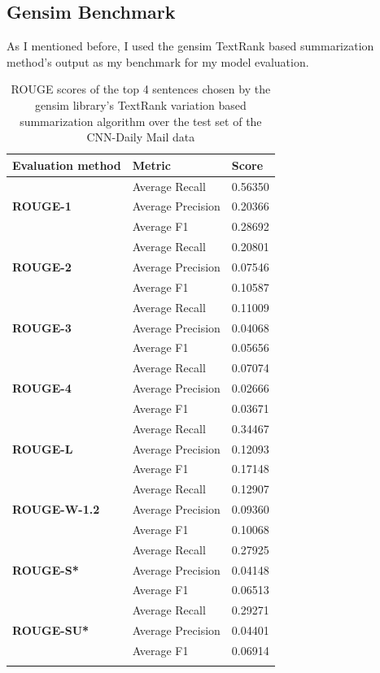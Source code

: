 \subsection{Gensim Benchmark}
As I mentioned before, I used the gensim TextRank based summarization method's output as my benchmark for my model evaluation.
\begin{longtable}{| l | l | l |}
	\hline
	\textbf{Evaluation method}&\textbf{Metric}&\textbf{Score}\\ \hline \hline
	\multirow{3}{*}{\textbf{ROUGE-1}}
	&Average Recall&0.56350 \\
	&Average Precision&0.20366  \\
	&Average F1&0.28692  \\ \hline \hline
	\multirow{3}{*}{\textbf{ROUGE-2}}
	&Average Recall&0.20801 \\
	&Average Precision&0.07546 \\
	&Average F1&0.10587 \\ \hline \hline
	\multirow{3}{*}{\textbf{ROUGE-3}}
	&Average Recall&0.11009 \\
	&Average Precision&0.04068 \\
	&Average F1&0.05656 \\ \hline \hline
	\multirow{3}{*}{\textbf{ROUGE-4}}
	&Average Recall&0.07074 \\
	&Average Precision&0.02666 \\
	&Average F1&0.03671 \\ \hline \hline
	\multirow{3}{*}{\textbf{ROUGE-L}}
	&Average Recall&0.34467 \\
	&Average Precision&0.12093 \\
	&Average F1&0.17148 \\ \hline \hline
	\multirow{3}{*}{\textbf{ROUGE-W-1.2}}
	&Average Recall&0.12907 \\
	&Average Precision&0.09360 \\
	&Average F1&0.10068 \\ \hline \hline
	\multirow{3}{*}{\textbf{ROUGE-S*}}
	&Average Recall&0.27925 \\
	&Average Precision&0.04148 \\
	&Average F1&0.06513 \\ \hline \hline
	\multirow{3}{*}{\textbf{ROUGE-SU*}}
	&Average Recall&0.29271 \\
	&Average Precision&0.04401 \\
	&Average F1&0.06914 \\ \hline
	\caption{ROUGE scores of the top 4 sentences chosen by the gensim library's TextRank variation based summarization algorithm over the test set of the CNN-Daily Mail data}
\end{longtable}

